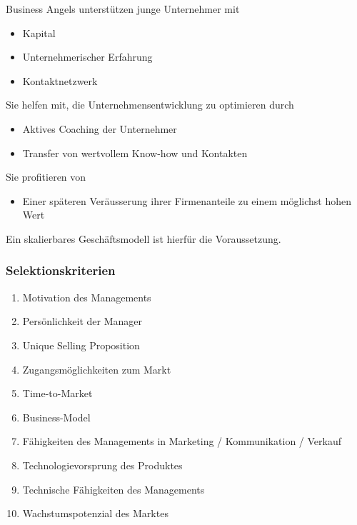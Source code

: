 Business Angels unterstützen junge Unternehmer mit
\begin{itemize}
	\item Kapital
	\item Unternehmerischer Erfahrung
	\item Kontaktnetzwerk
\end{itemize}
Sie helfen mit, die Unternehmensentwicklung zu optimieren durch
\begin{itemize}
	\item Aktives Coaching der Unternehmer
	\item Transfer von wertvollem Know-how und Kontakten
\end{itemize}
Sie profitieren von
\begin{itemize}
	\item Einer späteren Veräusserung ihrer Firmenanteile zu einem möglichst hohen Wert
\end{itemize}
Ein skalierbares Geschäftsmodell ist hierfür die Voraussetzung.

\subsubsection{Selektionskriterien}
\begin{multicols}{2}
	\begin{enumerate}
		\item Motivation des Managements 
		\item Persönlichkeit der Manager
		\item Unique Selling Proposition
		\item Zugangsmöglichkeiten zum Markt
		\item Time-to-Market
		\item Business-Model
		\item Fähigkeiten des Managements in Marketing / Kommunikation / Verkauf
		\item Technologievorsprung des Produktes
		\item Technische Fähigkeiten des Managements
		\item Wachstumspotenzial des Marktes
	\end{enumerate}
\end{multicols}


